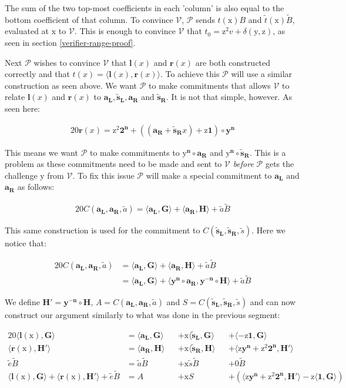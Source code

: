 \documentclass{article}
\newcommand{\eq}[1]{\begin{alignat*}{20}#1\end{alignat*}}
\renewcommand{\vec}[1]{\boldsymbol{#1}}
\newcommand{\ran}[1]{\mathrm{#1}}
\newcommand{\vecran}[1]{\mathbf{#1}}
\newcommand{\V}{\mathcal{V}}
\renewcommand{\P}{\mathcal{P}}
\newcommand{\dotp}[2]{\langle #1, #2 \rangle}
\newcommand{\opn}[1]{\operatorname{#1}}
\newcommand{\vecl}[1]{\vec{#1_{\opn{L}}}}
\newcommand{\vecr}[1]{\vec{#1_{\opn{R}}}}
\newcommand{\blind}[1]{\widetilde{#1}}
\newcommand{\bt}{\blind{t}}
\newcommand{\ba}{\blind{a}}
\newcommand{\bB}{\blind{B}}
\newcommand{\be}{\blind{e}}
\newcommand{\bs}{\blind{s}}
\begin{document}
The sum of the two top-most coefficients in each 'column' is also
equal to the bottom coefficient of that column. To convince $\V$, $\P$
sends $t(\ran{x})B$ and $\bt(\ran{x})\bB$, evaluated at $\ran{x}$
to $\V$. This is enough to convince $\V$ that $t_0 = \ran{z^2}v +
\delta(\ran{y},\ran{z})$, as seen in section \ref{verifier-range-proof}.

Next $\P$ wishes to convince $\V$ that $\vec{l}(x)$ and
$\vec{r}(x)$ are both constructed correctly and that $t(x) =
\dotp{\vec{l}(x)}{\vec{r}(x)}$. To achieve this $\P$ will use a similar
construction as seen above. We want $\P$ to make commitments that allows
$\V$ to relate $\vec{l}(x)$ and $\vec{r}(x)$ to $\vecl{a}, \vecl{\bs},
\vecr{a}$ and $\vecr{\bs}$. It is not that simple, however. As seen here:

\eq{
	\vec{r}(x) = \ran{z^2}\vec{2^n} + ((\vecr{a} + \vecr{\bs}x) + \ran{z}\vec{1})\circ\vecran{y}^{\vec{n}}
}

This means we want $\P$ to make commitments to $\vec{\ran{y}^n}\circ
\vecr{a}$ and $\vec{\ran{y}^n}\circ\vecr{\bs}$. This is a problem as these
commitments need to be made and sent to $\V$ \textit{before} $\P$
gets the challenge $\ran{y}$ from $\V$. To fix this issue $\P$ will
make a special commitment to $\vecl{a}$ and $\vecr{a}$ as follows:

\eq{
	C(\vecl{a}, \vecr{a}, \ba) = \dotp{\vecl{a}}{\vec{G}} + \dotp{\vecr{a}}{\vec{H}} + \ba\bB
}

This same construction is used for the commitment to $C(\vecl{\bs},
\vecr{\bs}, \bs)$. Here we notice that:

\eq{
	C(\vecl{a}, \vecr{a}, \ba) &= \dotp{\vecl{a}}{\vec{G}} + \dotp{\vecr{a}}{\vec{H}} + \ba\bB \\
	&= \dotp{\vecl{a}}{\vec{G}} + \dotp{\vecran{y}^{\vec{n}}\circ \vecr{a}}{\vecran{y^{-n}}\circ \vec{H}} + \ba\bB
}

We define $\vec{H'} = \vecran{y^{-n}}\circ\vec{H}$, $A =
C(\vecl{a},\vecr{a}, \ba)$ and $S = C(\vecl{\bs}, \vecr{\bs},
\bs)$ and can now construct our argument similarly to what
was done in the previous segment:

\eq{
	\dotp{\vec{l}(\ran{x})}{\vec{G}} &= \dotp{\vecl{a}}{\vec{G}} &&+ \ran{x}\dotp{\vecl{\bs}}{\vec{G}} &&+ \dotp{-\ran{z}\vec{1}}{\vec{G}} \\
	\dotp{\vec{r}(\ran{x})}{\vec{H'}} &= \dotp{\vecr{a}}{\vec{H}} &&+ \ran{x}\dotp{\vecr{\bs}}{\vec{H}} &&+ \dotp{\ran{z}\vecran{y}^{\vec{n}} + \ran{z^2}\vec{2^n}}{\vec{H'}}\\
	\be\bB &= \ba\bB &&+ \ran{x}\bs\bB &&+ 0 \bB \\
	\dotp{\vec{l}(\ran{x})}{\vec{G}} + \dotp{\vec{r}(\ran{x})}{\vec{H'}} + \be\bB &= A &&+ \ran{x}S &&+ (\dotp{\ran{z}\vecran{y}^{\vec{n}} + \ran{z^2}\vec{2^n}}{\vec{H'}} - \ran{z}\dotp{\vec{1}}{\vec{G}})
}
\end{document}
